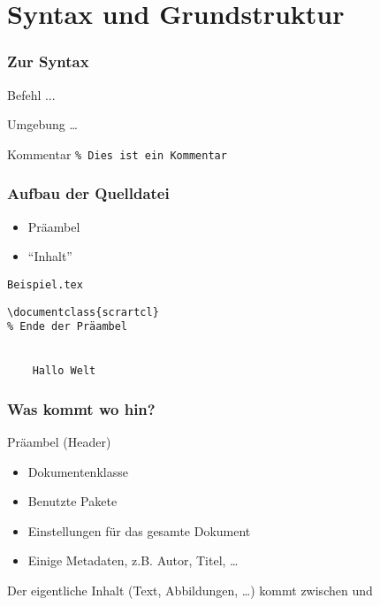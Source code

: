 \section{Syntax und Grundstruktur}

\begin{frame}[fragile]
    \frametitle{Zur Syntax}
    \begin{block}{Befehl}
        ...
    \end{block}
    \pause
    \begin{block}{Umgebung}
         \ldots {}
    \end{block}
    \pause
    \begin{block}{Kommentar}
        \verb+% Dies ist ein Kommentar+
    \end{block}
\end{frame}


\begin{frame}[fragile]
    \frametitle{Aufbau der Quelldatei}
    \begin{itemize}
        \item Präambel
        \item \enquote{Inhalt}
    \end{itemize}
    \bigskip
    \pause
    
    \begin{block}{\texttt{Beispiel.tex}}
\begin{verbatim}
\documentclass{scrartcl}
% Ende der Präambel


    Hallo Welt

\end{verbatim}
    \end{block}
\end{frame}


\begin{frame}[fragile]
    \frametitle{Was kommt wo hin?}
    Präambel (Header)
    \begin{itemize}
        \item Dokumentenklasse\pause
        \item Benutzte Pakete\pause
        \item Einstellungen für das gesamte Dokument\pause
        \item Einige Metadaten, z.B. Autor, Titel, \ldots
    \end{itemize}
    \bigskip\pause

    Der eigentliche Inhalt (Text, Abbildungen, \ldots) kommt zwischen \verb++ und \verb++
\end{frame}


